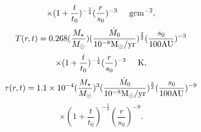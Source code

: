 \documentclass[apj]{emulateapj}
\begin{document}
%
%
\begin{equation}
\times (1+\frac{t}{t_0})^{-\frac{1}{4}} (\frac{r}{s_0})^{-3} \hspace{0.5cm} {\rm g} {\rm cm}^{-2},
\end{equation}
%
%
%
\begin{displaymath}
T (r, t) = 0.268 (\frac{M_{\star}}{M_{\odot}}) (\frac{\dot{M}_0}{10^{-8} {\rm M}_{\odot}/{\rm yr}} )^{\frac{2}{3}} (\frac{s_0}{100 {\rm AU}})^{-3}
\end{displaymath}
%
%
\begin{equation}\label{eq:Temp-thick}
\times (1+\frac{t}{t_0})^{-\frac{1}{2}} (\frac{r}{s_0})^{-3} \hspace{0.5cm} {\rm K},
\end{equation}
%
\begin{displaymath}
\tau (r, t) = 1.1\times 10^{-4} (\frac{M_{\star}}{M_{\odot}})^{3}(\frac{\dot{M}_0}{10^{-8} {\rm M}_{\odot}/{\rm yr}} )^{\frac{5}{3}} (\frac{s_0}{100 {\rm AU}})^{-9}
\end{displaymath}
%
%
\begin{equation}\label{eq:tau-thick}
\times (1+\frac{t}{t_0})^{-\frac{5}{4}} (\frac{r}{s_0})^{-9}.
\end{equation}
%
\end{document}
